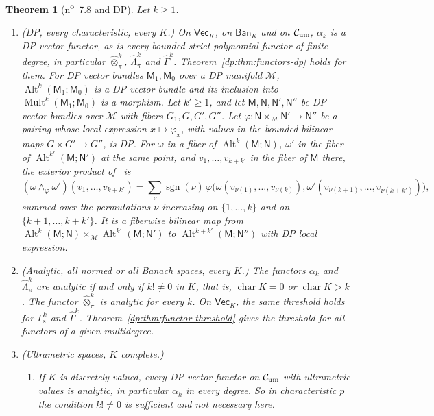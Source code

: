 \documentclass[11pt]{amsart}
\newtheorem{theorem}{Theorem}[section]
\theoremstyle{definition}
\theoremstyle{remark}
\numberwithin{equation}{section}
\newcommand{\Alt}{\operatorname{Alt}}
\newcommand{\Mult}{\operatorname{Mult}}
\newcommand{\sgn}{\operatorname{sgn}}
\newcommand{\cC}{\mathcal{C}}
\theoremstyle{plain}
\theoremstyle{definition}
\theoremstyle{plain}
\newcommand{\hot}{\mathbin{\widehat\otimes}}
\newcommand{\hLambda}{\widehat\Lambda}
\newcommand{\hGamma}{\widehat\Gamma}
\begin{document}
\begin{theorem}[n\textsuperscript{o}~7.8 and DP]\label{dp:thm:seven-eight-dp}
Let $k\ge1$.
\begin{enumerate}
\item \textup{(DP, every characteristic, every $K$.)} On $\mathsf{Vec}_K$, on $\mathsf{Ban}_K$ and on $\cC_{\rm um}$, $\alpha_k$ is a DP vector functor, as is every bounded strict polynomial functor of finite degree, in particular $\hot^k_\pi$, $\hLambda^k_\pi$ and $\hGamma^k$. Theorem~\ref{dp:thm:functors-dp} holds for them. For DP vector bundles $\mathsf M_1,\mathsf M_0$ over a DP manifold $\mathcal M$, $\Alt^k(\mathsf M_1;\mathsf M_0)$ is a DP vector bundle and its inclusion into $\Mult^k(\mathsf M_1;\mathsf M_0)$ is a morphism. Let $k'\ge1$, and let $\mathsf M,\mathsf N,\mathsf N',\mathsf N''$ be DP vector bundles over $\mathcal M$ with fibers $G_1,G,G',G''$. Let $\varphi\colon\mathsf N\times_{\mathcal M}\mathsf N'\to\mathsf N''$ be a pairing whose local expression $x\mapsto\varphi_x$, with values in the bounded bilinear maps $G\times G'\to G''$, is DP. For $\omega$ in a fiber of $\Alt^k(\mathsf M;\mathsf N)$, $\omega'$ in the fiber of $\Alt^{k'}(\mathsf M;\mathsf N')$ at the same point, and $v_1,\dots,v_{k+k'}$ in the fiber of $\mathsf M$ there, the exterior product of~\cite[n\textsuperscript{o}~7.8.2]{Bou} is
\begin{equation}\label{dp:fn:eq:exterior}
 (\omega\wedge_\varphi\omega')(v_1,\dots,v_{k+k'})=\sum_\nu\sgn(\nu)\,\varphi\bigl(\omega(v_{\nu(1)},\dots,v_{\nu(k)}),\omega'(v_{\nu(k+1)},\dots,v_{\nu(k+k')})\bigr),
\end{equation}
summed over the permutations $\nu$ increasing on $\{1,\dots,k\}$ and on $\{k+1,\dots,k+k'\}$. It is a fiberwise bilinear map from $\Alt^k(\mathsf M;\mathsf N)\times_{\mathcal M}\Alt^{k'}(\mathsf M;\mathsf N')$ to $\Alt^{k+k'}(\mathsf M;\mathsf N'')$ with DP local expression.
\item \textup{(Analytic, all normed or all Banach spaces, every $K$.)} The functors $\alpha_k$ and $\hLambda^k_\pi$ are analytic if and only if $k!\ne0$ in $K$, that is, $\operatorname{char}K=0$ or $\operatorname{char}K>k$. The functor $\hot^k_\pi$ is analytic for every $k$. On $\mathsf{Vec}_K$, the same threshold holds for $\Gamma^k_{\mathrm s}$ and $\hGamma^k$. Theorem~\ref{dp:thm:functor-threshold} gives the threshold for all functors of a given multidegree.
\item \textup{(Ultrametric spaces, $K$ complete.)}
\begin{enumerate}
\item If $K$ is discretely valued, every DP vector functor on $\cC_{\rm um}$ with ultrametric values is analytic, in particular $\alpha_k$ in every degree. So in characteristic $p$ the condition $k!\ne0$ is sufficient and not necessary here.

\end{enumerate}
\end{enumerate}
\end{theorem}
\end{document}
